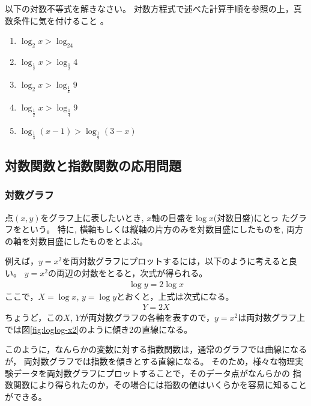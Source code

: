 \documentclass[twocolumn,11pt]{jarticle}
\begin{document}
\exercise
以下の対数不等式を解きなさい。
対数方程式で述べた計算手順を参照の上，真数条件に気を付けること
。
\begin{enumerate}
\item $\log_2x>\log_24$
\item $\log_\frac{1}{2}x>\log_\frac{1}{2}4$
\item $\log_2x>\log_\frac{1}{4}9$
\item $\log_\frac{1}{2}x>\log_\frac{1}{4}9$
\item $\log_\frac{1}{3}(x-1)>\log_\frac{1}{9}(3-x)$
\end{enumerate}

\subsection{対数関数と指数関数の応用問題}

\subsubsection{対数グラフ}
点$(x,y)$をグラフ上に表したいとき, $x$軸の目盛を$\log x$(対数目盛)にとっ
たグラフをという。
特に, 横軸もしくは縦軸の片方のみを対数目盛にしたものを,
両方の軸を対数目盛にしたものをとよぶ。

例えば，$y=x^2$を両対数グラフにプロットするには，以下のように考えると良い。
$y=x^2$の両辺の対数をとると，次式が得られる。
\begin{align*}
\log y=2\log x
\end{align*}
ここで，$X=\log x$, $y=\log y$とおくと，上式は次式になる。
\begin{align*}
Y=2X
\end{align*}
ちょうど，この$X$, $Y$が両対数グラフの各軸を表すので，$y=x^2$は両対数グラフ上
では図\ref{fig:loglog-x2}のように傾き2の直線になる。

このように，なんらかの変数に対する指数関数は，通常のグラフでは曲線になるが，
両対数グラフでは指数を傾きとする直線になる。
そのため，様々な物理実験データを両対数グラフにプロットすることで，そのデータ点がなんらかの
指数関数により得られたのか，その場合には指数の値はいくらかを容易に知ることができる。
\end{document}
